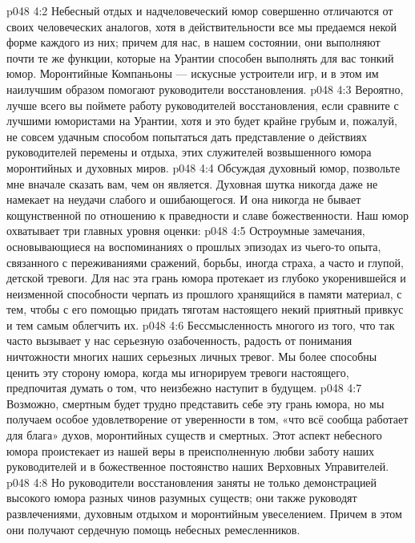 \vs p048 4:2 Небесный отдых и надчеловеческий юмор совершенно отличаются от своих человеческих аналогов, хотя в действительности все мы предаемся некой форме каждого из них; причем для нас, в нашем состоянии, они выполняют почти те же функции, которые на Урантии способен выполнять для вас тонкий юмор. Моронтийные Компаньоны --- искусные устроители игр, и в этом им наилучшим образом помогают руководители восстановления.
\vs p048 4:3 Вероятно, лучше всего вы поймете работу руководителей восстановления, если сравните с лучшими юмористами на Урантии, хотя и это будет крайне грубым и, пожалуй, не совсем удачным способом попытаться дать представление о действиях руководителей перемены и отдыха, этих служителей возвышенного юмора моронтийных и духовных миров.
\vs p048 4:4 \pc Обсуждая духовный юмор, позвольте мне вначале сказать вам, чем он  является. Духовная шутка никогда даже не намекает на неудачи слабого и ошибающегося. И она никогда не бывает кощунственной по отношению к праведности и славе божественности. Наш юмор охватывает три главных уровня оценки:
\vs p048 4:5 \pc {}\bibnobreakspace {} Остроумные замечания, основывающиеся на воспоминаниях о прошлых эпизодах из чьего\hyp{}то опыта, связанного с переживаниями сражений, борьбы, иногда страха, а часто и глупой, детской тревоги. Для нас эта грань юмора протекает из глубоко укоренившейся и неизменной способности черпать из прошлого хранящийся в памяти материал, с тем, чтобы с его помощью придать тяготам настоящего некий приятный привкус и тем самым облегчить их.
\vs p048 4:6 \pc {}\bibnobreakspace {} Бессмысленность многого из того, что так часто вызывает у нас серьезную озабоченность, радость от понимания ничтожности многих наших серьезных личных тревог. Мы более способны ценить эту сторону юмора, когда мы игнорируем тревоги настоящего, предпочитая думать о том, что неизбежно наступит в будущем.
\vs p048 4:7 \pc {}\bibnobreakspace {} Возможно, смертным будет трудно представить себе эту грань юмора, но мы получаем особое удовлетворение от уверенности в том, «что всё сообща работает для блага» духов, моронтийных существ и смертных. Этот аспект небесного юмора проистекает из нашей веры в преисполненную любви заботу наших руководителей и в божественное постоянство наших Верховных Управителей.
\vs p048 4:8 \pc Но руководители восстановления заняты не только демонстрацией высокого юмора разных чинов разумных существ; они также руководят развлечениями, духовным отдыхом и моронтийным увеселением. Причем в этом они получают сердечную помощь небесных ремесленников.
